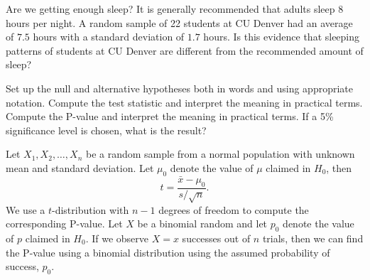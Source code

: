 \clearpage

\ii Are we getting enough sleep?  It is generally recommended that adults sleep 8 hours per night. A random sample of 22  students at CU Denver had an average of $7.5$ hours with a standard deviation of $1.7$ hours. Is this evidence that sleeping patterns of students at CU Denver are different from the recommended amount of sleep?

\bb
\ii Set up the null and alternative hypotheses both in words and using appropriate notation. \vspace{1in}
\ii  Compute the test statistic and interpret the meaning in practical terms. \vfill
\ii  Compute the P-value and interpret the meaning in practical terms. \vfill
\ii If a 5\% significance level is chosen, what is the result? \vspace{1.5in}
\ee
\ee


\bbox
\bi
\ii Let $X_1, X_2, \ldots , X_n$  be a random sample from a normal population with unknown mean and standard deviation.  Let $\mu_0$ denote the value of $\mu$ claimed in $H_0$, then
\[ t = \frac{\bar{x}-\mu_0}{s/\sqrt{n}}.\]
We use a $t$-distribution with $n-1$ degrees of freedom to compute the corresponding P-value.
\ii Let $X$ be a binomial random and let $p_0$ denote the value of $p$ claimed in $H_0$.  If we observe $X=x$ successes out of $n$ trials, then we can find the P-value using a binomial distribution using the assumed probability of success, $p_0$.
\ei
\ebox

